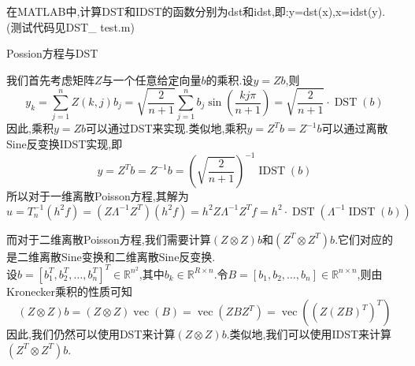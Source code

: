 \documentclass[notheorems,serif]{beamer}
\renewcommand{\normalsize}{\wuhao}
\newcommand{\wuhao}{\fontsize{10.5pt}{\baselineskip}\selectfont}
\begin{document}
\begin{frame}
在MATLAB中,计算DST和IDST的函数分别为{\color{blue}dst}和{\color{blue}idst},即:{\color{blue}y=dst(x),x=idst(y)}. (测试代码见{\color{blue}DST\_ test.m})\\
\end{frame}

\begin{frame}


{\color{blue}\Large Possion方程与DST}

\quad

\normalsize
我们首先考虑矩阵$Z$与一个任意给定向量$b$的乘积.设$y=Zb$,则
$$
y_{k}=\sum_{j=1}^{n} Z(k, j) b_{j}=\sqrt{\frac{2}{n+1}} \sum_{j=1}^{n} b_{j} \sin \left(\frac{k j \pi}{n+1}\right)=\sqrt{\frac{2}{n+1}} \cdot \operatorname{DST}(b)
$$
因此,乘积$y=Zb$可以通过DST来实现.类似地,乘积$y=Z^{T} b=Z^{-1} b$可以通过离散Sine反变换IDST实现,即
$$
y=Z^{T} b=Z^{-1} b=\left(\sqrt{\frac{2}{n+1}}\right)^{-1} \operatorname{IDST}(b)
$$
所以对于一维离散Poisson方程,其解为
$$
u=T_{n}^{-1}\left(h^{2} f\right)=\left(Z \Lambda^{-1} Z^{T}\right)\left(h^{2} f\right)=h^{2} Z \Lambda^{-1} Z^{T} f=h^{2} \cdot \operatorname{DST}\left(\Lambda^{-1} \operatorname{IDST}(b)\right)
$$
\end{frame}

\begin{frame}
而对于二维离散Poisson方程,我们需要计算$(Z \otimes Z) b$和$\left(Z^{T} \otimes Z^{T}\right) b$.它们对应的是二维离散Sine变换和二维离散Sine反变换.\\
设$b=\left[b_{1}^{T}, b_{2}^{T}, \ldots, b_{n}^{T}\right]^{T} \in \mathbb{R}^{n^{2}}$,其中$b_{k} \in \mathbb{R}^{R \times n}$.令$B=\left[b_{1}, b_{2}, \ldots, b_{n}\right] \in\mathbb{R}^{n \times n}$,则由Kronecker乘积的性质可知
$$
(Z \otimes Z) b=(Z \otimes Z) \operatorname{vec}(B)=\operatorname{vec}\left(Z B Z^{T}\right)=\operatorname{vec}\left(\left(Z(Z B)^{T}\right)^{T}\right)
$$
因此,我们仍然可以使用DST来计算$(Z \otimes Z) b$.类似地,我们可以使用IDST来计算$\left(Z^{T} \otimes Z^{T}\right) b$.\\
\end{frame}
\end{document}
